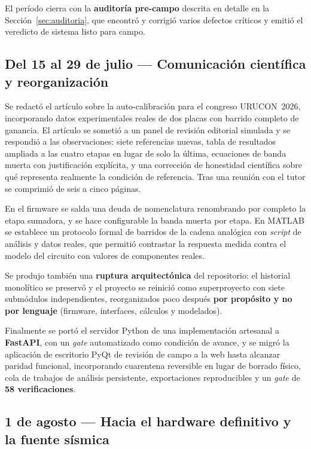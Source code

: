 El per\'iodo cierra con la \textbf{auditor\'ia pre-campo} descrita en detalle en la
Secci\'on~\ref{sec:auditoria}, que encontr\'o y corrigi\'o varios defectos cr\'iticos y emiti\'o
el veredicto de sistema listo para campo.

\subsection{Del 15 al 29 de julio --- Comunicaci\'on cient\'ifica y reorganizaci\'on}

Se redact\'o el art\'iculo sobre la auto-calibraci\'on para el congreso URUCON~2026,
incorporando datos experimentales reales de dos placas con barrido completo de ganancia.
El art\'iculo se someti\'o a un panel de revisi\'on editorial simulada y se respondi\'o a las
observaciones: siete referencias nuevas, tabla de resultados ampliada a las cuatro etapas
en lugar de solo la \'ultima, ecuaciones de banda muerta con justificaci\'on expl\'icita, y
una correcci\'on de honestidad cient\'ifica sobre qu\'e representa realmente la condici\'on de
referencia. Tras una reuni\'on con el tutor se comprimi\'o de seis a cinco p\'aginas.

En el firmware se salda una deuda de nomenclatura renombrando por completo la etapa
sumadora, y se hace configurable la banda muerta por etapa. En MATLAB se establece un
protocolo formal de barridos de la cadena anal\'ogica con \emph{script} de an\'alisis y
datos reales, que permiti\'o contrastar la respuesta medida contra el modelo del circuito
con valores de componentes reales.

Se produjo tambi\'en una \textbf{ruptura arquitect\'onica} del repositorio: el historial
monol\'itico se preserv\'o y el proyecto se reinici\'o como superproyecto con siete
subm\'odulos independientes, reorganizados poco despu\'es \textbf{por prop\'osito y no por
lenguaje} (firmware, interfaces, c\'alculos y modelados).

Finalmente se port\'o el servidor Python de una implementaci\'on artesanal a
\textbf{FastAPI}, con un \emph{gate} automatizado como condici\'on de avance, y se
migr\'o la aplicaci\'on de escritorio PyQt de revisi\'on de campo a la web hasta alcanzar
paridad funcional, incorporando cuarentena reversible en lugar de borrado f\'isico, cola
de trabajos de an\'alisis persistente, exportaciones reproducibles y un \emph{gate} de
\textbf{58 verificaciones}.

\subsection{1 de agosto --- Hacia el hardware definitivo y la fuente s\'ismica}

